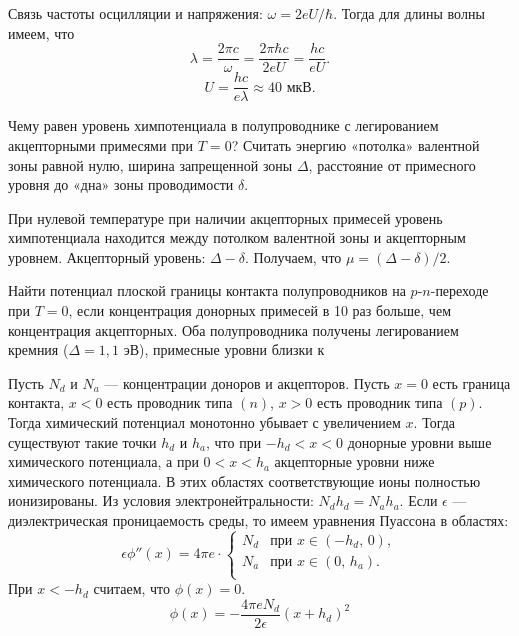 \documentclass[10pt,landscape,a4paper]{article}
\begin{document}
\begin{multicols*}{5}
\begin{sol}
Связь частоты осцилляции и напряжения: $\omega=2eU /\hbar $.
Тогда для длины волны имеем, что
\[
\lambda= \frac{2\pi c}{\omega}= \frac{2\pi \hbar c}{2eU}=
\frac{hc}{eU} 
.\] 
\[
U=\frac{hc}{e\lambda}\approx
40 \text{ мкВ}
.\] 
\end{sol}
\begin{hiProb}[0-11-1]
Чему равен уровень химпотенциала в полупроводнике с легированием акцепторными примесями при $T=0$? Считать энергию «потолка» валентной зоны равной нулю, ширина запрещенной зоны $\Delta$, расстояние от примесного уровня до «дна» зоны проводимости $\delta$.
\end{hiProb}
\begin{sol}
При нулевой температуре при наличии акцепторных
примесей уровень химпотенциала находится между
потолком валентной зоны и акцепторным уровнем.
Акцепторный уровень: $\Delta-\delta$. Получаем,
что $\mu = (\Delta-\delta) /2$.
\end{sol}
\begin{hiProb}[0-11-2]
Найти потенциал плоской границы контакта полупроводников на $p$-$n$-переходе при $T=0$, если концентрация донорных примесей в 10 раз больше, чем концентрация акцепторных. Оба полупроводника получены легированием кремния ($\Delta=1,1\text{ эВ}$), примесные уровни близки к
\end{hiProb}
\begin{sol}
Пусть $N_d$ и $N_a$ --- концентрации доноров и
акцепторов. Пусть $x=0$ есть граница контакта, $x<0$
есть проводник типа $(n)$, $x>0$ есть проводник
типа $(p)$. Тогда химический потенциал монотонно убывает
с увеличением $x$. Тогда существуют такие точки $h_d$ и
$h_a$, что при $-h_d<x<0$ донорные уровни выше
химического потенциала, а при $0<x<h_a$ акцепторные
уровни ниже химического потенциала. В этих областях
соответствующие ионы полностью ионизированы.
Из условия электронейтральности: $N_d h_d=N_a h_a$.
Если  $\epsilon $ --- диэлектрическая проницаемость
среды, то имеем уравнения Пуассона в областях:
\[
	\epsilon \phi''(x)=4\pi e\cdot 
	\begin{cases}
		N_d & \text{при } x  \in \left( -h_d,\,0 \right) ,\\
		N_a & \text{при } x  \in \left( 0,\,h_a \right) .\\
	\end{cases}
\] 
При $x < -h_d$ считаем, что $\phi(x)=0$.
\[
	\phi(x)=%
		- \frac{4\pi e N_d}{2\epsilon }(x+h_d)^2
\]
\end{sol}
\end{multicols*}
\end{document}
